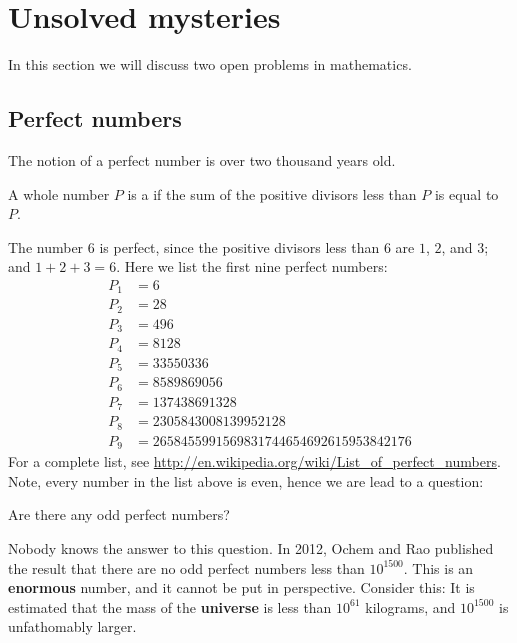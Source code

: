 \documentclass{ximera}
\begin{document}
\section{Unsolved mysteries}

In this section we will discuss two open problems in mathematics.

\subsection{Perfect numbers}

The notion of a perfect number is over two thousand years old.

\begin{definition}
  A whole number $P$ is a  if the sum of the
  positive divisors less than $P$ is equal to $P$.
\end{definition}
The number $6$ is perfect, since the positive divisors less than $6$
are $1$, $2$, and $3$; and $1+2+3 = 6$.  Here we list the first nine
perfect numbers:
\begin{align*}
P_1 &= 6\\
P_2 &= 28\\
P_3 &= 496\\
P_4 &= 8128\\
P_5 &= 33550336\\
P_6 &= 8589869056\\
P_7 &= 137438691328\\
P_8 &= 2305843008139952128\\
P_9 &= 2658455991569831744654692615953842176
\end{align*}
For a complete list, see
\url{http://en.wikipedia.org/wiki/List_of_perfect_numbers}.  Note,
every number in the list above is even, hence we are lead to a question:


\begin{question}
  Are there any odd perfect numbers?
  \begin{prompt}
    \begin{multipleChoice}
    \end{multipleChoice}
  \end{prompt}
\end{question}

Nobody knows the answer to this question. In 2012, Ochem and Rao
published the result that there are no odd perfect numbers less than
$10^{1500}$. This is an \textbf{enormous} number, and it cannot be put
in perspective. Consider this: It is estimated that the mass of the
\textbf{universe} is less than $10^{61}$ kilograms, and $10^{1500}$ is
unfathomably larger.
\end{document}
